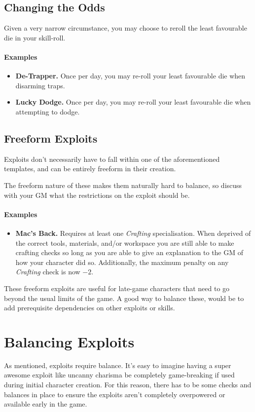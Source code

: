 \subsection{Changing the Odds}
Given a very narrow circumstance, you may choose to reroll the least favourable die in your skill-roll.
\paragraph{Examples}
\begin{itemize}
    \item \textbf{De-Trapper.} Once per day, you may re-roll your least favourable die when disarming traps.
    \item \textbf{Lucky Dodge.} Once per day, you may re-roll your least favourable die when attempting to dodge.
\end{itemize}

\subsection{Freeform Exploits}
Exploits don't necessarily have to fall within one of the aforementioned templates, and can be entirely freeform in their creation.

The freeform nature of these makes them naturally hard to balance, so discuss with your GM what the restrictions on the exploit should be.

\paragraph{Examples}
\begin{itemize}
    \item \textbf{Mac's Back.} Requires at least one \textit{Crafting} specialisation.
    When deprived of the correct tools, materials, and/or workspace you are still able to make crafting checks so long as you are able to give an explanation to the GM of how your character did so.
Additionally, the maximum penalty on any \textit{Crafting} check is now $-2$.
\end{itemize}

These freeform exploits are useful for late-game characters that need to go beyond the usual limits of the game. A good way to balance these, would be to add prerequisite dependencies on other exploits or skills.

\section{Balancing Exploits}\label{sec:exploit-balance}
As mentioned, exploits require balance.
It's easy to imagine having a super awesome exploit like uncanny charisma be completely game-breaking if used during initial character creation.
For this reason, there has to be some checks and balances in place to ensure the exploits aren't completely overpowered or available early in the game.

